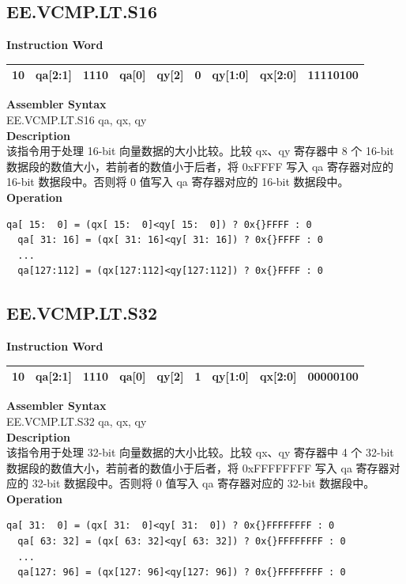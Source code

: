 \clearpage
\subsection{EE.VCMP.LT.S16}\label{instruction:EEVCMPLTS16}
\setlength\tabcolsep{6pt}
\textbf{Instruction Word} \\
\begin{tabular}{|c|c|c|c|c|c|c|c|c|}
	\hline
	10 & qa[2:1] & 1110 & qa[0] & qy[2] & 0 & qy[1:0] & qx[2:0] & 11110100 \\
	\hline
\end{tabular}

\textbf{Assembler Syntax} \\
EE.VCMP.LT.S16 qa, qx, qy \\
\textbf{Description} \\
该指令用于处理 16-bit 向量数据的大小比较。比较 qx、qy 寄存器中 8 个 16-bit 数据段的数值大小，若前者的数值小于后者，将 0x{}FFFF 写入 qa 寄存器对应的 16-bit 数据段中。否则将 0 值写入 qa 寄存器对应的 16-bit 数据段中。\\
\textbf{Operation}
\begin{lstlisting}[escapeinside=`?]
  qa[ 15:  0] = (qx[ 15:  0]<qy[ 15:  0]) ? 0x{}FFFF : 0
  qa[ 31: 16] = (qx[ 31: 16]<qy[ 31: 16]) ? 0x{}FFFF : 0
  ...
  qa[127:112] = (qx[127:112]<qy[127:112]) ? 0x{}FFFF : 0
\end{lstlisting}

\clearpage
\subsection{EE.VCMP.LT.S32}\label{instruction:EEVCMPLTS32}
\setlength\tabcolsep{6pt}
\textbf{Instruction Word} \\
\begin{tabular}{|c|c|c|c|c|c|c|c|c|}
	\hline
	10 & qa[2:1] & 1110 & qa[0] & qy[2] & 1 & qy[1:0] & qx[2:0] & 00000100 \\
	\hline
\end{tabular}

\textbf{Assembler Syntax} \\
EE.VCMP.LT.S32 qa, qx, qy \\
\textbf{Description} \\
该指令用于处理 32-bit 向量数据的大小比较。比较 qx、qy 寄存器中 4 个 32-bit 数据段的数值大小，若前者的数值小于后者，将 0x{}FFFFFFFF 写入 qa 寄存器对应的 32-bit 数据段中。否则将 0 值写入 qa 寄存器对应的 32-bit 数据段中。\\
\textbf{Operation}
\begin{lstlisting}[escapeinside=`?]
  qa[ 31:  0] = (qx[ 31:  0]<qy[ 31:  0]) ? 0x{}FFFFFFFF : 0
  qa[ 63: 32] = (qx[ 63: 32]<qy[ 63: 32]) ? 0x{}FFFFFFFF : 0
  ...
  qa[127: 96] = (qx[127: 96]<qy[127: 96]) ? 0x{}FFFFFFFF : 0
\end{lstlisting}

